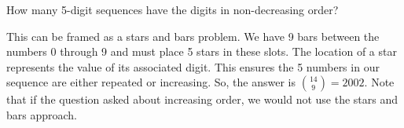 \question How many 5-digit sequences have the digits in non-decreasing order?

\begin{solution}[.5 in]
This can be framed as a stars and bars problem. We have 9 bars between the numbers 0 through 9 and must place 5 stars in these slots. The location of a star represents the value of its associated digit. This ensures the 5 numbers in our sequence are either repeated or increasing. So, the answer is ${14 \choose 9} = 2002$. Note that if the question asked about increasing order, we would not use the stars and bars approach.  
\end{solution}
